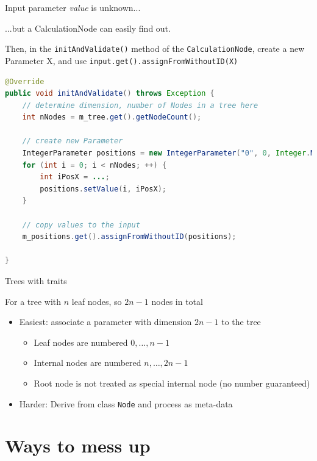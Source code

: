 \documentclass{beamer}
\theoremstyle{definition}
\begin{document}
\begin{frame}[containsverbatim]{Input parameter {\em value} is unknown...}

...but a CalculationNode can easily find out.\vskip 0.5cm

Then, in the {\tt initAndValidate()} method of the {\tt CalculationNode},
create a new Parameter X, and use {\tt input.get().assignFromWithoutID(X)}

\begin{lstlisting}[language=java]
@Override
public void initAndValidate() throws Exception {
    // determine dimension, number of Nodes in a tree here
	int nNodes = m_tree.get().getNodeCount();

    // create new Parameter
	IntegerParameter positions = new IntegerParameter("0", 0, Integer.MAX_VALUE, nNodes);
	for (int i = 0; i < nNodes; ++) {
		int iPosX = ...;
		positions.setValue(i, iPosX);
	}

    // copy values to the input
	m_positions.get().assignFromWithoutID(positions);
	
}
\end{lstlisting}

\end{frame}

\begin{frame}[containsverbatim]{Trees with traits}

For a tree with $n$ leaf nodes, so $2n-1$ nodes in total
\begin{itemize}
\item Easiest: associate a parameter with dimension $2n-1$ to the tree
\begin{itemize}
\item Leaf nodes are numbered $0,\ldots,n-1$
\item Internal nodes are numbered $n,\ldots,2n-1$
\item Root node is not treated as special internal node (no number guaranteed)
\end{itemize}
\item Harder: Derive from class {\tt Node} and process as meta-data
\end{itemize}

\end{frame}


\section{Ways to mess up}
\end{document}
